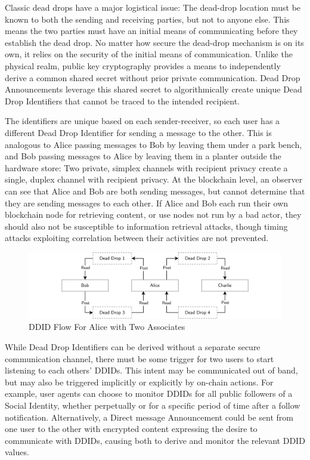 \documentclass[12pt,letterpaper]{article}
\begin{document}
Classic dead drops have a major logistical issue: The dead-drop location must be known to
both the sending and receiving parties, but not to anyone else. This means the two parties
must have an initial means of communicating before they establish the dead drop. No matter
how secure the dead-drop mechanism is on its own, it relies on the security of the initial
means of communication. Unlike the physical realm, public key cryptography provides a
means to independently derive a common shared secret without prior private
communication.\cite{diffie-hellman1976} Dead Drop Announcements leverage this shared
secret to algorithmically create unique Dead Drop Identifiers that cannot be traced to the
intended recipient.

The identifiers are unique based on each sender-receiver, so each user has a different
Dead Drop Identifier for sending a message to the other. This is analogous to Alice
passing messages to Bob by leaving them under a park bench, and Bob passing messages to
Alice by leaving them in a planter outside the hardware store: Two private, simplex
channels with recipient privacy create a single, duplex channel with recipient privacy. At
the blockchain level, an observer can see that Alice and Bob are both sending messages,
but cannot determine that they are sending messages to each other. If Alice and Bob each
run their own blockchain node for retrieving content, or use nodes not run by a bad actor,
they should also not be susceptible to information retrieval attacks, though timing
attacks exploiting correlation between their activities are not prevented.

\begin{figure}
	\includegraphics[width=\linewidth]{figures/DDID Flow For Alice with Two Associates.png}
	\caption{DDID Flow For Alice with Two Associates}
	\label{fig:7}
\end{figure}

While Dead Drop Identifiers can be derived without a separate secure communication
channel, there must be some trigger for two users to start listening to each others'
DDIDs. This intent may be communicated out of band, but may also be triggered implicitly
or explicitly by on-chain actions. For example, user agents can choose to monitor DDIDs
for all public followers of a Social Identity, whether perpetually or for a specific
period of time after a follow notification. Alternatively, a Direct message Announcement
could be sent from one user to the other with encrypted content expressing the desire to
communicate with DDIDs, causing both to derive and monitor the relevant DDID values.
\end{document}
